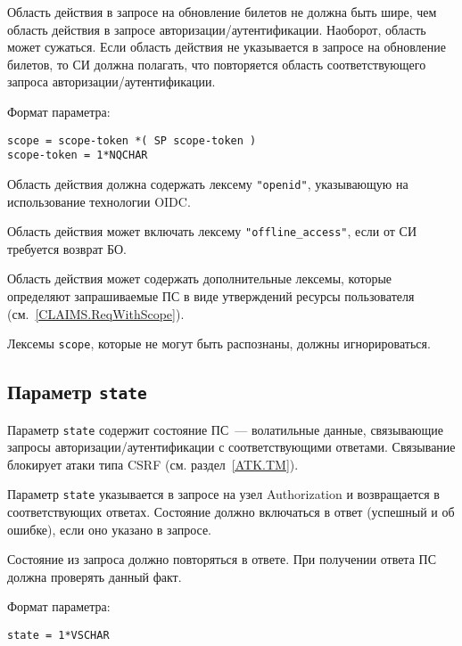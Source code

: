 Область действия в запросе на обновление билетов не должна быть шире, чем 
область действия в запросе авторизации/аутентификации. Наоборот, область
может сужаться. 
%
Если область действия не указывается в запросе на обновление билетов,
то СИ должна полагать, что повторяется область соответствующего запроса
авторизации/аутентификации.

Формат параметра:
\begin{lstlisting}
scope = scope-token *( SP scope-token )
scope-token = 1*NQCHAR
\end{lstlisting}

Область действия должна содержать лексему \lstinline{"openid"},
указывающую на использование технологии OIDC. 

Область действия может включать лексему \lstinline{"offline_access"}, 
если от СИ требуется возврат БО. 

Область действия может содержать дополнительные лексемы, которые 
определяют запрашиваемые ПС в виде утверждений ресурсы пользователя
(см.~\ref{CLAIMS.ReqWithScope}). 

Лексемы \lstinline{scope}, которые не могут быть распознаны, должны 
игнорироваться.

\subsection{Параметр \lstinline{state}}\label{PARAMS.State} 

Параметр \lstinline{state} содержит состояние ПС~--- волатильные данные, 
связывающие запросы авторизации/аутентификации с соответствующими ответами. 
%
Связывание блокирует атаки типа CSRF (см. раздел~\ref{ATK.TM}).

Параметр \lstinline{state} указывается в запросе на узел Authorization и 
возвращается в соответствующих ответах.
%
Состояние должно включаться в ответ (успешный и об ошибке), если оно указано в 
запросе. 

Состояние из запроса должно повторяться в ответе. При получении ответа ПС 
должна проверять данный факт.

Формат параметра:
\begin{lstlisting}
state = 1*VSCHAR
\end{lstlisting}

	
